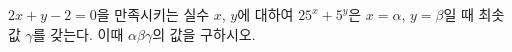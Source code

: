 $2x+y-2=0$을 만족시키는 실수 $x$, $y$에 대하여 $25^{x}+5^{y}$은 $x=\alpha$, $y=\beta$일 때 최솟값 $\gamma$를 갖는다. 이때 $\alpha\beta\gamma$의 값을 구하시오.
